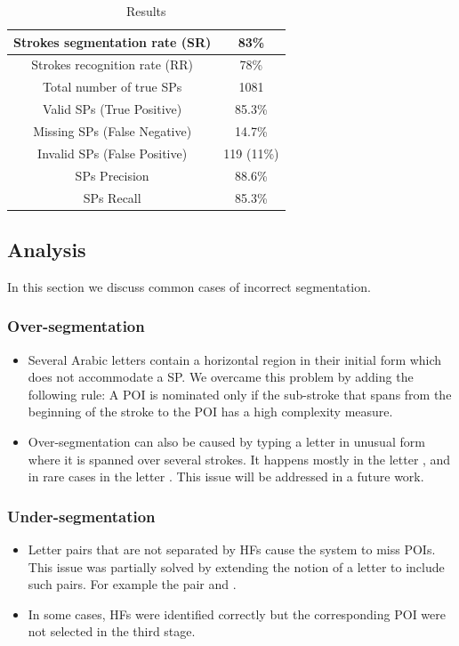 \documentclass[10pt, conference, compsocconf]{IEEEtran}
\begin{document}
\begin{table}[h]
\caption{Results}
\renewcommand{\arraystretch}{1.2}
\begin{tabular}{ | c | c | }
  \hline
  Strokes segmentation rate (SR) &  83\% \\ 
  \hline
  Strokes recognition rate (RR) &  78\% \\ 
 \hline
  Total number of true SPs & 1081 \\
  \hline
  Valid SPs (True Positive) & 85.3\% \\
    \hline
  Missing SPs (False Negative) & 14.7\% \\
  \hline
  Invalid SPs (False Positive) & 119 (11\%) \\
  \hline                                    
  SPs Precision & 88.6\% \\ 
 \hline
  SPs Recall &  85.3\% \\ 
 \hline
\end{tabular}
\centering
\label{table:results} 
\end{table}

\subsection{Analysis}
In this section we discuss common cases of incorrect segmentation.
\subsubsection{Over-segmentation}
\begin{itemize}
\item Several Arabic letters contain a horizontal region in their initial form which does not accommodate a SP. We overcame this problem by adding the following rule: A POI is nominated only if the sub-stroke that spans from the beginning of the stroke to the POI has a high complexity measure.
\item Over-segmentation can also be caused by typing a letter in unusual form where it is spanned over several strokes. 
It happens mostly in the letter ,  and in rare cases in the letter . This issue will be addressed in a future work.
\end{itemize}

\subsubsection{Under-segmentation}
\begin{itemize}
\item Letter pairs that are not separated by HFs cause the system to miss POIs. This issue was partially solved by extending the notion of a letter to include such pairs. For example the pair  and .
\item In some cases, HFs were identified correctly but the corresponding POI were not selected in the third stage. \\
\end{itemize}
\end{document}
